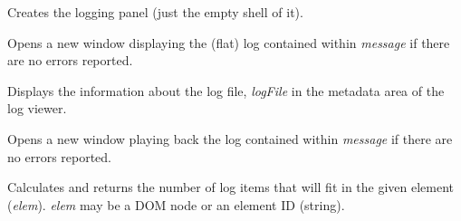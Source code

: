 \documentclass[letterpaper,10pt,openany]{sphinxmanual}
\begin{document}

\begin{fulllineitems}
\label{Applications/terminal/plugin_logging:GateOne.TermLogging.createPanel}
Creates the logging panel (just the empty shell of it).

\end{fulllineitems}


\begin{fulllineitems}
\label{Applications/terminal/plugin_logging:GateOne.TermLogging.displayFlatLogAction}
Opens a new window displaying the (flat) log contained within \emph{message} if there are no errors reported.

\end{fulllineitems}


\begin{fulllineitems}
\label{Applications/terminal/plugin_logging:GateOne.TermLogging.displayMetadata}
Displays the information about the log file, \emph{logFile} in the metadata area of the log viewer.

\end{fulllineitems}


\begin{fulllineitems}
\label{Applications/terminal/plugin_logging:GateOne.TermLogging.displayPlaybackLogAction}
Opens a new window playing back the log contained within \emph{message} if there are no errors reported.

\end{fulllineitems}


\begin{fulllineitems}
\label{Applications/terminal/plugin_logging:GateOne.TermLogging.getMaxLogItems}
Calculates and returns the number of log items that will fit in the given element (\emph{elem}).  \emph{elem} may be a DOM node or an element ID (string).

\end{fulllineitems}
\end{document}
